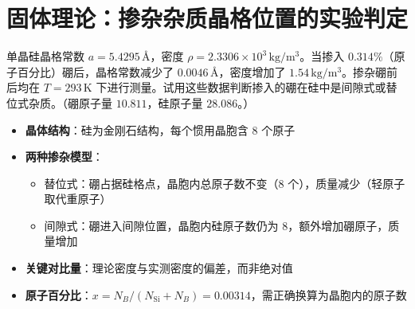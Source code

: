 \section{固体理论：掺杂杂质晶格位置的实验判定}
\label{sec:doping-site-determination}

\begin{modelbox}
单晶硅晶格常数 $a=5.4295\,\text{\AA}$，密度 $\rho=2.3306\times 10^{3}\,\mathrm{kg/m^{3}}$。当掺入 $0.314\%$（原子百分比）硼后，晶格常数减少了 $0.0046\,\text{\AA}$，密度增加了 $1.54\,\mathrm{kg/m^{3}}$。掺杂硼前后均在 $T=293\,\mathrm{K}$ 下进行测量。试用这些数据判断掺入的硼在硅中是间隙式或替位式杂质。（硼原子量 $10.811$，硅原子量 $28.086$。）
\end{modelbox}

\begin{tipbox}[考点快速分析]
\begin{itemize}
    \item \textbf{晶体结构}：硅为金刚石结构，每个惯用晶胞含 $8$ 个原子
    \item \textbf{两种掺杂模型}：
    \begin{itemize}
        \item 替位式：硼占据硅格点，晶胞内总原子数不变（$8$ 个），质量减少（轻原子取代重原子）
        \item 间隙式：硼进入间隙位置，晶胞内硅原子数仍为 $8$，额外增加硼原子，质量增加
    \end{itemize}
    \item \textbf{关键对比量}：理论密度与实测密度的偏差，而非绝对值
    \item \textbf{原子百分比}：$x = N_B/(N_{\mathrm{Si}}+N_B) = 0.00314$，需正确换算为晶胞内的原子数
\end{itemize}
\end{tipbox}

